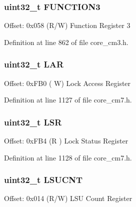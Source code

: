 \subsubsection[{\texorpdfstring{F\+U\+N\+C\+T\+I\+O\+N3}{FUNCTION3}}]{ uint32\+\_\+t F\+U\+N\+C\+T\+I\+O\+N3}\hypertarget{struct_d_w_t___type_afbfaba1d10558329868c6c55f91f82df}{}\label{struct_d_w_t___type_afbfaba1d10558329868c6c55f91f82df}
Offset\+: 0x058 (R/W) Function Register 3 

Definition at line 862 of file core\+\_\+cm3.\+h.

\subsubsection[{\texorpdfstring{L\+AR}{LAR}}]{ uint32\+\_\+t L\+AR}\hypertarget{struct_d_w_t___type_acc9e51f871c357a9094105435b150d13}{}\label{struct_d_w_t___type_acc9e51f871c357a9094105435b150d13}
Offset\+: 0x\+F\+B0 ( W) Lock Access Register 

Definition at line 1127 of file core\+\_\+cm7.\+h.

\subsubsection[{\texorpdfstring{L\+SR}{LSR}}]{ uint32\+\_\+t L\+SR}\hypertarget{struct_d_w_t___type_a7219432d03f6cd1d220f4fe10aef4880}{}\label{struct_d_w_t___type_a7219432d03f6cd1d220f4fe10aef4880}
Offset\+: 0x\+F\+B4 (R ) Lock Status Register 

Definition at line 1128 of file core\+\_\+cm7.\+h.

\subsubsection[{\texorpdfstring{L\+S\+U\+C\+NT}{LSUCNT}}]{ uint32\+\_\+t L\+S\+U\+C\+NT}\hypertarget{struct_d_w_t___type_ae886261750c8c90d67a2f276d074e9c3}{}\label{struct_d_w_t___type_ae886261750c8c90d67a2f276d074e9c3}
Offset\+: 0x014 (R/W) L\+SU Count Register 

